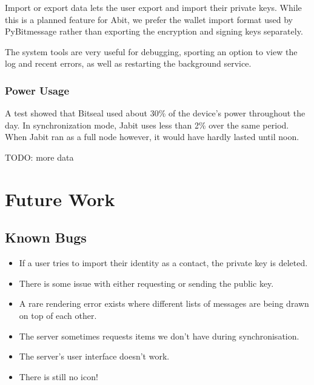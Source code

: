 \documentclass{bfh}
\begin{document}
  Import or export data lets the user export and import their private keys. While this is a planned feature for Abit, we prefer the wallet import format used by PyBitmessage rather than exporting the encryption and signing keys separately.

  The system tools are very useful for debugging, sporting an option to view the log and recent errors, as well as restarting the background service.

  \subsubsection{Power Usage}
  A test showed that Bitseal used about 30\% of the device's power throughout the day. In synchronization mode, Jabit uses less than 2\% over the same period. When Jabit ran as a full node however, it would have hardly lasted until noon.

TODO: more data


  \newpage
  \section{Future Work}
  \subsection{Known Bugs}
  \begin{itemize}
    \item If a user tries to import their identity as a contact, the private key is deleted.
    \item There is some issue with either requesting or sending the public key.
    \item A rare rendering error exists where different lists of messages are being drawn on top of each other.
    \item The server sometimes requests items we don't have during synchronisation.
    \item The server's user interface doesn't work.
    \item There is still no icon!
  \end{itemize}
\end{document}
